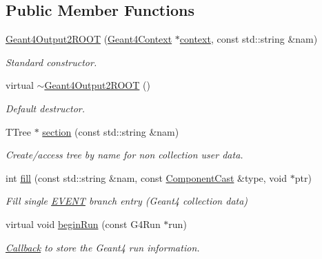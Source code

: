 \subsection*{Public Member Functions}
\begin{DoxyCompactItemize}
\item 
\hyperlink{class_d_d4hep_1_1_simulation_1_1_geant4_output2_r_o_o_t_a88f110e8c6e98e19a5580535aeb3120e}{Geant4\+Output2\+R\+O\+OT} (\hyperlink{class_d_d4hep_1_1_simulation_1_1_geant4_context}{Geant4\+Context} $\ast$\hyperlink{class_d_d4hep_1_1_simulation_1_1_geant4_action_aa9d87f0ec2a72b7fc2591b18f98d75cf}{context}, const std\+::string \&nam)
\begin{DoxyCompactList}\small\item\em Standard constructor. \end{DoxyCompactList}\item 
virtual \hyperlink{class_d_d4hep_1_1_simulation_1_1_geant4_output2_r_o_o_t_a572289de75b5e3a65cb3bda92139cba2}{$\sim$\+Geant4\+Output2\+R\+O\+OT} ()
\begin{DoxyCompactList}\small\item\em Default destructor. \end{DoxyCompactList}\item 
T\+Tree $\ast$ \hyperlink{class_d_d4hep_1_1_simulation_1_1_geant4_output2_r_o_o_t_adc1bb7b0301e2d6ce233c3042a220a70}{section} (const std\+::string \&nam)
\begin{DoxyCompactList}\small\item\em Create/access tree by name for non collection user data. \end{DoxyCompactList}\item 
int \hyperlink{class_d_d4hep_1_1_simulation_1_1_geant4_output2_r_o_o_t_acaa86fe60f13b62e6331e34182cdd75f}{fill} (const std\+::string \&nam, const \hyperlink{class_d_d4hep_1_1_component_cast}{Component\+Cast} \&type, void $\ast$ptr)
\begin{DoxyCompactList}\small\item\em Fill single \hyperlink{namespace_e_v_e_n_t}{E\+V\+E\+NT} branch entry (Geant4 collection data) \end{DoxyCompactList}\item 
virtual void \hyperlink{class_d_d4hep_1_1_simulation_1_1_geant4_output2_r_o_o_t_a03f3906460b18ff0b31b9c0f9060d93d}{begin\+Run} (const G4\+Run $\ast$run)
\begin{DoxyCompactList}\small\item\em \hyperlink{class_d_d4hep_1_1_callback}{Callback} to store the Geant4 run information. \end{DoxyCompactList}\item 

\end{DoxyCompactItemize}
